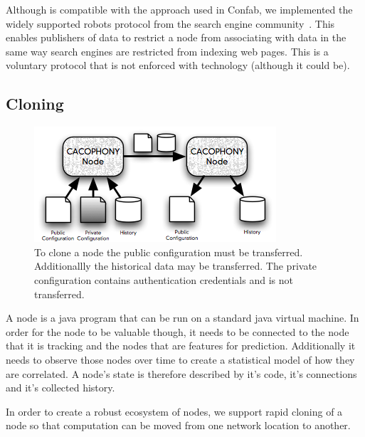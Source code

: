 Although \Cacophony is compatible with
the approach used in Confab, we implemented the widely supported robots protocol from the search
engine community~\cite{robotstxt}.  This enables publishers of data to restrict
a \Cacophony node from associating with data in the same way search engines
are restricted from indexing web pages.  This is a voluntary protocol that is
not enforced with technology (although it could be).

\subsection{Cloning}

\begin{figure}
	\begin{center}
		\includegraphics[width=1.00\columnwidth]{images/cloning}

	\caption{\label{fig:cloning}To clone a \Cacophony node the public
	configuration must be transferred.  Additionallly the historical data may be
	transferred.  The private configuration contains authentication credentials
	and is not transferred.}
	\end{center}
\end{figure}


A \Cacophony node is a java program that can be run on a standard java virtual
machine.  In order for the node to be valuable though, it needs to be connected
to the node that it is tracking and the nodes that are features for prediction.
Additionally it needs to observe those nodes over time to create a statistical
model of how they are correlated.  A node's state is therefore described by it's code,
it's connections and it's collected history.

In order to create a robust ecosystem of \Cacophony nodes, we support rapid
cloning of a node so that computation can be moved from one network location to
another.


